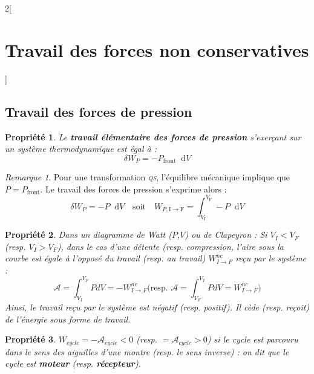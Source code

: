 \documentclass[french]{book}
\newtheorem*{propriete}{Propriété}
\theoremstyle{definition}
\theoremstyle{remark}
\newtheorem*{remarque}{Remarque}
\newcommand*\dif{\mathop{}\!\mathrm{d}}
\newcommand*{\point}[1]{\mathrm{#1}}
\newcommand*{\tdef}[1]{\textbf{#1}}
\newcommand*{\imp}[1]{\emph{#1}}
\newcommand*{\abr}[1]{\textsc{#1}}
\begin{document}
\begin{landscape}
\begin{multicols*}{2}[\section{Travail des forces non conservatives}]

\subsection{Travail des forces de pression}

\begin{propriete}
Le \tdef{travail élémentaire des forces de pression} s'exerçant sur un système thermodynamique est égal à :
\[\delta W_P = -P_{\mathrm{front}} \dif V\]
\end{propriete}

\begin{remarque}
Pour une transformation \imp{\abr{qs}}, l'équilibre mécanique implique que $P = P_{\mathrm{front}}$. Le travail des forces de pression s'exprime alors :
\[\delta W_P = -P \dif V \quad \text{soit} \quad W_{P, \point{I} \to \point{F}} = \int_{V_{\point{I}}}^{V_{\point{F}}} -P \dif V\]
\end{remarque}

\begin{propriete}

Dans un diagramme de Watt ($P$,$V$) ou de Clapeyron :
Si $V_I<V_F$ (resp. $V_I>V_F$), dans le cas d'une \imp{détente} (resp. \imp{compression}, l'aire sous la courbe est égale à l'opposé du travail (resp. au travail) $W^{nc}_{I\rightarrow F}$ reçu par le système :
\[
\mathscr{A} = \int_{V_I}^{V_F}PdV = -W^{nc}_{I\rightarrow F} \text{(resp. } \mathscr{A} = \int_{V_F}^{V_I}PdV = W^{nc}_{I\rightarrow F} \text{)}
\]
Ainsi, le travail reçu par le système est négatif (resp. positif). Il cède (resp. reçoit) de l'énergie sous forme de travail.

\end{propriete}

\begin{propriete}

$W_{cycle} = -\mathscr{A}_{cycle} < 0$ (resp. $= \mathscr{A}_{cycle} > 0$)  si le cycle est parcouru dans le sens des aiguilles d'une montre (resp. le sens inverse) : on dit que le cycle est \tdef{moteur} (resp. \tdef{récepteur}).

\end{propriete}


\end{multicols*}
\end{landscape}
\end{document}
